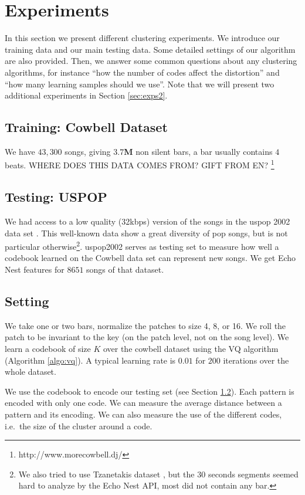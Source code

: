 \documentclass{article}
\newcommand{\ie}{i.e.~}
\begin{document}
\section{Experiments}\label{sec:experiments}
In this section we present different clustering experiments. We introduce
our training data and our main testing data. Some detailed settings
of our algorithm are also provided. Then, we answer some common questions
about any clustering algorithms, for instance 
``how the number of codes affect the distortion''
and ``how many learning samples should we use''.
Note that we will present two additional experiments in 
Section \ref{sec:exps2}.


\subsection{Training: Cowbell Dataset}\label{sec:traindata}
We have $43,300$ songs, giving  
$\mathbf{3.7}$\textbf{M} 
non silent bars, a bar usually 
contains $4$ beats. WHERE DOES THIS DATA COMES FROM? GIFT FROM EN?
\footnote{http://www.morecowbell.dj/}

\subsection{Testing: USPOP}\label{sec:testdata}
We had access to a low quality (32kbps) version of the songs in the uspop 2002 
data set \cite{uspop2002}.
This well-known data show a great diversity of pop songs, but is not particular
otherwise\footnote{We 
also tried to use Tzanetakis dataset \cite{Tzanetakis2002a}, but 
the $30$ seconds segments seemed hard to analyze by the Echo Nest API, most did
not contain any bar.}.
uspop2002 serves as testing set to measure how well a codebook learned on
the Cowbell data set can represent new songs. We get Echo Nest features
for $8651$ songs of that dataset.


\subsection{Setting}\label{ssec:setting}
We take one or two bars, normalize the patches to size 4, 8, or 16.
We roll the patch to be invariant to the key (on the patch level, not on
the song level). We learn a codebook of size $K$ over the cowbell dataset 
using the VQ algorithm (Algorithm \ref{algo:vq}). A typical learning rate 
is $0.01$ for $200$ iterations over the whole dataset.

We use the codebook to encode our testing set (see Section \ref{sec:testdata}).
Each pattern is encoded with only one code. We can measure the average
distance between a pattern and its encoding. We can also measure the use
of the different codes, \ie the size of the cluster around a code.
\end{document}
